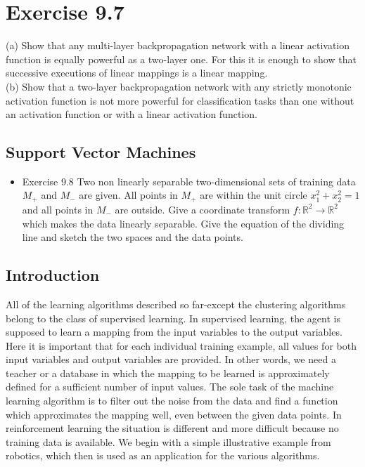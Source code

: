 \documentclass[10pt]{book}
\begin{document}
\section{Exercise 9.7}
(a) Show that any multi-layer backpropagation network with a linear activation function is equally powerful as a two-layer one. For this it is enough to show that successive executions of linear mappings is a linear mapping.\\
(b) Show that a two-layer backpropagation network with any strictly monotonic activation function is not more powerful for classification tasks than one without an activation function or with a linear activation function.

\subsection{Support Vector Machines}
\begin{itemize}
  \item Exercise 9.8 Two non linearly separable two-dimensional sets of training data $M_{+}$ and $M_{-}$ are given. All points in $M_{+}$ are within the unit circle $x_{1}^{2}+x_{2}^{2}=1$ and all points in $M_{-}$ are outside. Give a coordinate transform $f: \mathbb{R}^{2} \rightarrow \mathbb{R}^{2}$ which makes the data linearly separable. Give the equation of the dividing line and sketch the two spaces and the data points.
\end{itemize}

\subsection{Introduction}
All of the learning algorithms described so far-except the clustering algorithms belong to the class of supervised learning. In supervised learning, the agent is supposed to learn a mapping from the input variables to the output variables. Here it is important that for each individual training example, all values for both input variables and output variables are provided. In other words, we need a teacher or a database in which the mapping to be learned is approximately defined for a sufficient number of input values. The sole task of the machine learning algorithm is to filter out the noise from the data and find a function which approximates the mapping well, even between the given data points.
In reinforcement learning the situation is different and more difficult because no training data is available. We begin with a simple illustrative example from robotics, which then is used as an application for the various algorithms.
\end{document}

